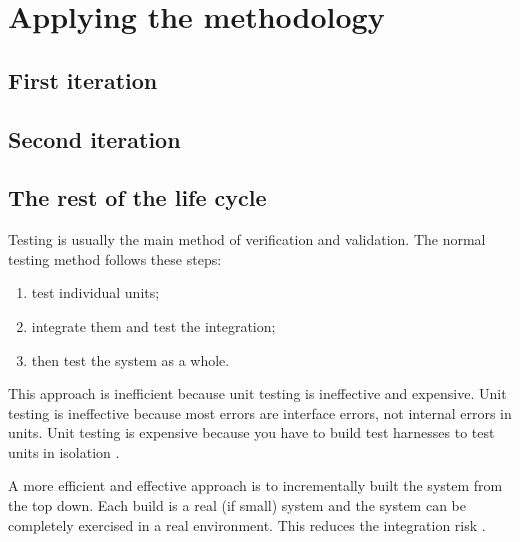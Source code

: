 
\chapter{Applying the methodology} %

\label{Chapter_Applying_the_methodology} %

\section{First iteration}

\section{Second iteration}

\section{The rest of the life cycle}




Testing is usually the main method of verification and validation. The normal testing
method follows these steps:
\begin{enumerate}
	\item test individual units; 
	\item integrate them and test the integration; 
	\item then test the system as a whole. 
\end{enumerate}
This approach is inefficient because unit testing is ineffective and expensive. 
Unit testing is ineffective because most errors are interface errors, not internal
errors in units. Unit testing is expensive because you have to build test 
harnesses to test units in isolation \parencite{CbyCPraxis}.

A more efficient and effective approach is to incrementally built the system from
the top down. Each build is a real (if small) system and the system can be completely 
exercised in a real environment. This reduces the integration risk \parencite{CbyCPraxis}.

